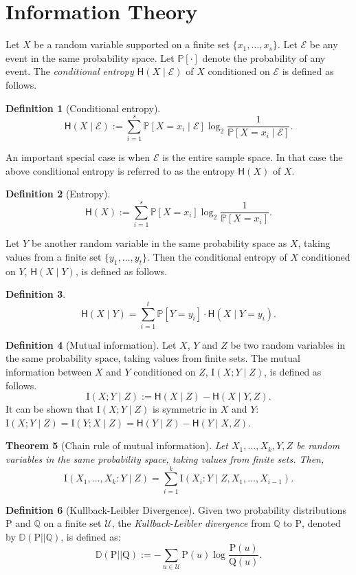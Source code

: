 \documentclass[11pt]{article}
\numberwithin{equation}{section}
\newtheorem{theorem}{Theorem}[section]
\theoremstyle{definition}
\newtheorem{definition}[theorem]{Definition}
\theoremstyle{plain}
\newcommand{\Q}{\mathbb Q}
\newcommand{\D}{\mathbb{D}}
\newcommand{\clU}{\mathcal{U}}
\newcommand{\rH}{\mathsf{H}}
\newcommand{\II}{\mathrm{I}}
\begin{document}
\section{Information Theory}
\label{infotheory}
Let $X$ be a random variable supported on a finite set $\{x_1, \ldots, x_s\}$. Let $\mathcal{E}$ be any event in the same probability space. Let $\mathbb{P}[\cdot]$ denote the probability of any event. The \emph{conditional entropy} $\rH(X \mid \mathcal{E})$ of $X$ conditioned on $\mathcal{E}$ is defined as follows.
\begin{definition}[Conditional entropy]
	\[\rH(X \mid \mathcal{E}):=\sum_{i=1}^s \mathbb{P}[X=x_i \mid \mathcal{E}]\log_2 \frac{1}{\mathbb{P}[X=x_i \mid \mathcal{E}]}.\]
\end{definition}
An important special case is when $\mathcal{E}$ is the entire sample space. In that case the above conditional entropy is referred to as the entropy $\rH(X)$ of $X$.
\begin{definition}[Entropy]
	\[\rH(X):=\sum_{i=1}^s\mathbb{P}[X=x_i] \log_2 \frac{1}{\mathbb{P}[X=x_i]}.\]
\end{definition}
Let $Y$ be another random variable in the same probability space as $X$, taking values from a finite set $\{y_1, \ldots, y_t\}$. Then the conditional entropy of $X$ conditioned on $Y$, $\rH(X \mid Y)$, is defined as follows.
\begin{definition}
	\[\rH(X \mid Y)=\sum_{i=1}^t \mathbb{P}[Y=y_i] \cdot \rH(X \mid Y=y_i).\]
\end{definition}
\begin{definition}[Mutual information]
	Let $X$, $Y$ and $Z$ be two random variables in the same probability space, taking values from finite sets. The mutual information between $X$ and $Y$ conditioned on $Z$, $\mathrm{I}(X;Y \mid Z)$, is defined as follows.
	\[\mathrm{I}(X;Y \mid Z):=\rH(X \mid Z)-\rH(X \mid Y, Z).\]
	It can be shown that $\mathrm{I}(X;Y \mid Z)$ is symmetric in $X$ and $Y$: $\mathrm{I}(X;Y \mid Z)=\mathrm{I}(Y;X \mid Z)=\rH(Y \mid Z)-\rH(Y \mid X, Z)$.
\end{definition}
\begin{theorem}[Chain rule of mutual information]
\label{chainrule}
Let $X_1, \ldots, X_k, Y, Z$ be random variables in the same probability space, taking values from finite sets. Then,
\[\II(X_1, \ldots, X_k:Y \mid Z)=\sum_{i=1}^k\II(X_i : Y \mid Z, X_1, \ldots, X_{i-1}).\]
\end{theorem}
\begin{definition}[Kullback-Leibler Divergence]
\label{klpd}
Given two probability distributions $\text{P}$ and $\Q$ on a finite set $\clU$, the \emph{Kullback-Leibler %
divergence}   %
from $\Q$ to $\text{P}$, denoted by $\D(\text{P} || \Q)$, is defined as:
\[\D(\text{P} || \text{Q}):=-\sum_{u \in \clU}\text{P}(u) \log \frac{\text{P}(u)}{\text{Q}(u)}.\]
\end{definition}
\end{document}

